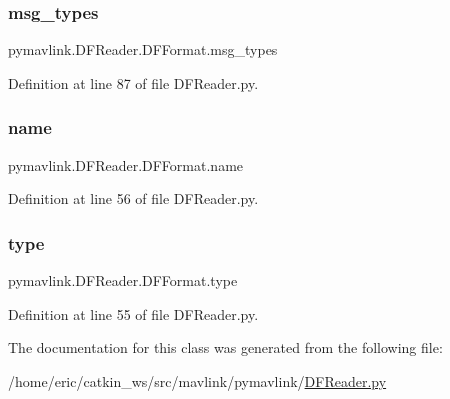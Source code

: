 \subsubsection{\texorpdfstring{msg\_types}{msg\_types}}
{\footnotesize\ttfamily pymavlink.\+D\+F\+Reader.\+D\+F\+Format.\+msg\+\_\+types}



Definition at line 87 of file D\+F\+Reader.\+py.

\mbox{\label{classpymavlink_1_1DFReader_1_1DFFormat_ad341e8512ba46835ee1e029d4141231f}} 
\subsubsection{\texorpdfstring{name}{name}}
{\footnotesize\ttfamily pymavlink.\+D\+F\+Reader.\+D\+F\+Format.\+name}



Definition at line 56 of file D\+F\+Reader.\+py.

\mbox{\label{classpymavlink_1_1DFReader_1_1DFFormat_a2b5d2f5837b6a88c5155cf0e242f740f}} 
\subsubsection{\texorpdfstring{type}{type}}
{\footnotesize\ttfamily pymavlink.\+D\+F\+Reader.\+D\+F\+Format.\+type}



Definition at line 55 of file D\+F\+Reader.\+py.



The documentation for this class was generated from the following file\+:\begin{DoxyCompactItemize}
\item 
/home/eric/catkin\+\_\+ws/src/mavlink/pymavlink/\mbox{\hyperlink{DFReader_8py}{D\+F\+Reader.\+py}}\end{DoxyCompactItemize}
